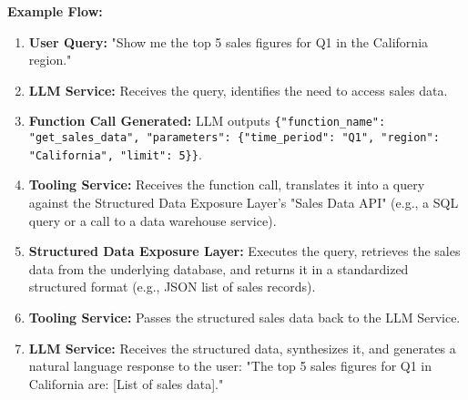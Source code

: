 \documentclass[10pt, a4paper]{article}
\begin{document}
\textbf{Example Flow:}
\begin{enumerate}
    \item \textbf{User Query:} "Show me the top 5 sales figures for Q1 in the California region."
    \item \textbf{LLM Service:} Receives the query, identifies the need to access sales data.
    \item \textbf{Function Call Generated:} LLM outputs \texttt{\{"function\_name": "get\_sales\_data", "parameters": \{"time\_period": "Q1", "region": "California", "limit": 5\}\}}.
    \item \textbf{Tooling Service:} Receives the function call, translates it into a query against the Structured Data Exposure Layer's "Sales Data API" (e.g., a SQL query or a call to a data warehouse service).
    \item \textbf{Structured Data Exposure Layer:} Executes the query, retrieves the sales data from the underlying database, and returns it in a standardized structured format (e.g., JSON list of sales records).
    \item \textbf{Tooling Service:} Passes the structured sales data back to the LLM Service.
    \item \textbf{LLM Service:} Receives the structured data, synthesizes it, and generates a natural language response to the user: "The top 5 sales figures for Q1 in California are: [List of sales data]."
\end{enumerate}
\end{document}
